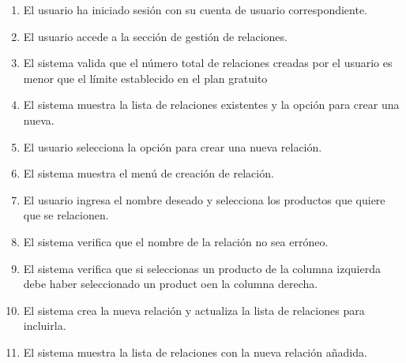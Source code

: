 \begin{enumerate}
    \item El usuario ha iniciado sesión con su cuenta de usuario correspondiente.
    \item El usuario accede a la sección de gestión de relaciones.
    \item El sistema valida que el número total de relaciones creadas por el usuario es menor que el límite establecido en el plan gratuito
    \item El sistema muestra la lista de relaciones existentes y la opción para crear una nueva.
    \item El usuario selecciona la opción para crear una nueva relación.
    \item El sistema muestra el menú de creación de relación.
    \item El usuario ingresa el nombre deseado y selecciona los productos que quiere que se relacionen.
    \item El sistema verifica que el nombre de la relación no sea erróneo.
    \item El sistema verifica que si seleccionas un producto de la columna izquierda debe haber seleccionado un product oen la columna derecha.
    \item El sistema crea la nueva relación y actualiza la lista de relaciones para incluirla.
    \item El sistema muestra la lista de relaciones con la nueva relación añadida.
\end{enumerate}

